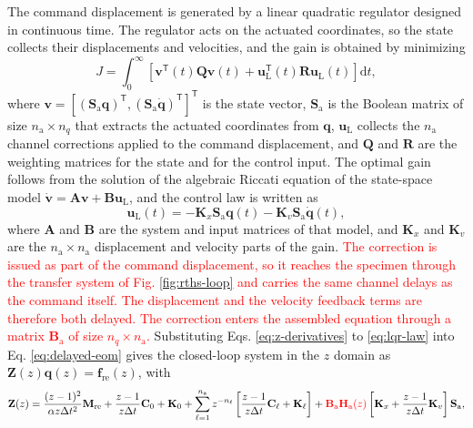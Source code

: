 \documentclass[11pt,a4paper]{article}
\numberwithin{equation}{section}
\newcommand{\rev}[1]{\textcolor{red}{#1}}
\begin{document}
The command displacement is generated by a linear quadratic regulator designed in continuous time. The regulator acts on the actuated coordinates, so the state collects their displacements and velocities, and the gain is obtained by minimizing
\begin{equation}
	J=\int_{0}^{\infty}
	\left[
	\bm{v}^{\mathsf{T}}(t)\mathbf{Q}\bm{v}(t)
	+\bm{u}_{\mathrm{L}}^{\mathsf{T}}(t)\mathbf{R}\bm{u}_{\mathrm{L}}(t)
	\right]\mathrm{d}t,
	\label{eq:lqr-cost}
\end{equation}
where \(\bm{v}=[(\mathbf{S}_{\mathrm{a}}\bm{q})^{\mathsf{T}},(\mathbf{S}_{\mathrm{a}}\dot{\bm{q}})^{\mathsf{T}}]^{\mathsf{T}}\) is the state vector, \(\mathbf{S}_{\mathrm{a}}\) is the Boolean matrix of size \(n_{\mathrm{a}}\times n_{q}\) that extracts the actuated coordinates from \(\bm{q}\), \(\bm{u}_{\mathrm{L}}\) collects the \(n_{\mathrm{a}}\) channel corrections applied to the command displacement, and \(\mathbf{Q}\) and \(\mathbf{R}\) are the weighting matrices for the state and for the control input. The optimal gain follows from the solution of the algebraic Riccati equation of the state-space model \(\dot{\bm{v}}=\mathbf{A}\bm{v}+\mathbf{B}\bm{u}_{\mathrm{L}}\), and the control law is written as
\begin{equation}
	\bm{u}_{\mathrm{L}}(t)=
	-\mathbf{K}_{x}\mathbf{S}_{\mathrm{a}}\bm{q}(t)
	-\mathbf{K}_{v}\mathbf{S}_{\mathrm{a}}\dot{\bm{q}}(t),
	\label{eq:lqr-law}
\end{equation}
where \(\mathbf{A}\) and \(\mathbf{B}\) are the system and input matrices of that model, and \(\mathbf{K}_{x}\) and \(\mathbf{K}_{v}\) are the \(n_{\mathrm{a}}\times n_{\mathrm{a}}\) displacement and velocity parts of the gain. \rev{The correction is issued as part of the command displacement, so it reaches the specimen through the transfer system of Fig. \ref{fig:rths-loop} and carries the same channel delays as the command itself. The displacement and the velocity feedback terms are therefore both delayed. The correction enters the assembled equation through a matrix \(\mathbf{B}_{\mathrm{a}}\) of size \(n_{q}\times n_{\mathrm{a}}\).}
Substituting Eqs. \eqref{eq:z-derivatives} to \eqref{eq:lqr-law} into Eq. \eqref{eq:delayed-eom} gives the closed-loop system in the \(z\) domain as \(\mathbf{Z}(z)\bm{q}(z)=\bm{f}_{\mathrm{re}}(z)\), with
\begin{equation}
	\mathbf{Z}(z)=
	\frac{(z-1)^{2}}{\alpha z\Delta t^{2}}\mathbf{M}_{\mathrm{re}}
	+\frac{z-1}{z\Delta t}\mathbf{C}_{0}+\mathbf{K}_{0}
	+\sum_{\ell=1}^{n_{\mathrm{a}}}z^{-n_{\ell}}
	\left[
	\frac{z-1}{z\Delta t}\mathbf{C}_{\ell}+\mathbf{K}_{\ell}
	\right]
	+\rev{\mathbf{B}_{\mathrm{a}}\mathbf{H}_{\mathrm{a}}(z)}
	\left[
	\mathbf{K}_{x}+\frac{z-1}{z\Delta t}\mathbf{K}_{v}
	\right]\mathbf{S}_{\mathrm{a}},
	\label{eq:z-matrix}
\end{equation}
\end{document}
